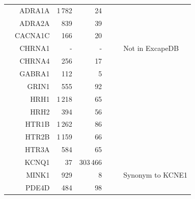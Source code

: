 \documentclass[utf8]{frontiersSCNS} %
\begin{document}
\begin{table}[p]
\begin{tabular}{crrrrcl}
&    ADRA1A  &       1\,782  &       24          &            &       &       \\
&    ADRA2A  &       839     &       39          &            &       &       \\
&    CACNA1C &       166     &       20          &            &       &       \\
&    CHRNA1  &       -       &       -           &            &       & Not in ExcapeDB \\
&    CHRNA4  &       256     &       17          &            &       &       \\
&    GABRA1  &       112     &       5           &            &       &       \\
&    GRIN1   &       555     &       92          &            &       &       \\
&    HRH1    &       1\,218  &       65          &            &       &       \\
&    HRH2    &       394     &       56          &            &       &       \\
&    HTR1B   &       1\,262  &       86          &            &       &       \\
&    HTR2B   &       1\,159  &       66          &            &       &       \\
&    HTR3A   &       584     &       65          &            &       &       \\
&    KCNQ1   &       37      &       303\,466    &            &       &       \\
&    MINK1   &       929     &       8           &            &       & Synonym to KCNE1 \\
&    PDE4D   &       484     &       98          &            &       &       \\

\bottomrule
\end{tabular}
\end{table}
\end{document}
